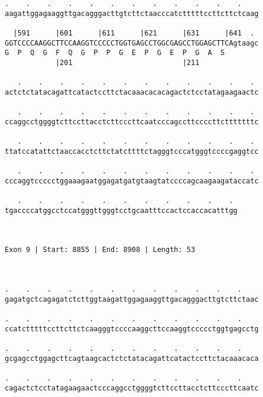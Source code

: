 \documentclass{article}
\begin{document}
\begin{Verbatim}
.    .    .    .    .    .    .    .    .    .    .    .    
aagattggagaaggttgacagggacttgtcttctaacccatctttttccttcttctcaag
                                                            
  |591      |601      |611      |621      |631      |641  . 
GGTCCCCAAGGCTTCCAAGGTCCCCCTGGTGAGCCTGGCGAGCCTGGAGCTTCAgtaagc
G  P  Q  G  F  Q  G  P  P  G  E  P  G  E  P  G  A  S        
            |201                          |211              
  
   .    .    .    .    .    .    .    .    .    .    .    . 
actctctatacagattcatactccttctacaaacacacagactctcctatagaagaactc
                                                            
   .    .    .    .    .    .    .    .    .    .    .    . 
ccaggcctggggtcttccttacctcttcccttcaatcccagccttccccttctttttttc
                                                            
   .    .    .    .    .    .    .    .    .    .    .    . 
ttatccatattctaaccacctcttctatcttttctagggtcccatgggtccccgaggtcc
                                                            
   .    .    .    .    .    .    .    .    .    .    .    . 
cccaggtccccctggaaagaatggagatgatgtaagtatccccagcaagaagataccatc
                                                            
   .    .    .    .    .    .    .    .    .    .    . 
tgaccccatggcctccatgggttgggtcctgcaatttccactccaccacatttgg
                                                       
                                                       
 
Exon 9 | Start: 8855 | End: 8908 | Length: 53



.    .    .    .    .    .    .    .    .    .    .    .    
gagatgctcagagatctcttggtaagattggagaaggttgacagggacttgtcttctaac
                                                            
.    .    .    .    .    .    .    .    .    .    .    .    
ccatctttttccttcttctcaagggtccccaaggcttccaaggtccccctggtgagcctg
                                                            
.    .    .    .    .    .    .    .    .    .    .    .    
gcgagcctggagcttcagtaagcactctctatacagattcatactccttctacaaacaca
                                                            
.    .    .    .    .    .    .    .    .    .    .    .    
cagactctcctatagaagaactcccaggcctggggtcttccttacctcttcccttcaatc
                                                            

\end{Verbatim}
\end{document}
